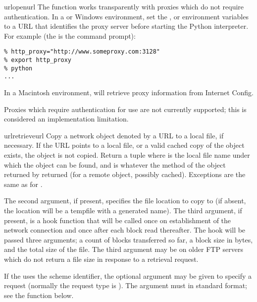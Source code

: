 \begin{funcdesc}{urlopen}{url}
The  function works transparently with proxies
which do not require authentication.  In a \UNIX{} or Windows
environment, set the ,  or
 environment variables to a URL that identifies
the proxy server before starting the Python interpreter.  For example
(the \character{\%} is the command prompt):

\begin{verbatim}
% http_proxy="http://www.someproxy.com:3128"
% export http_proxy
% python
...
\end{verbatim}

In a Macintosh environment,  will retrieve proxy
information from Internet Config.

Proxies which require authentication for use are not currently
supported; this is considered an implementation limitation.
\end{funcdesc}

\begin{funcdesc}{urlretrieve}{url}
Copy a network object denoted by a URL to a local file, if necessary.
If the URL points to a local file, or a valid cached copy of the
object exists, the object is not copied.  Return a tuple
 where  is the
local file name under which the object can be found, and 
is whatever the  method of the object returned by
 returned (for a remote object, possibly cached).
Exceptions are the same as for .

The second argument, if present, specifies the file location to copy
to (if absent, the location will be a tempfile with a generated name).
The third argument, if present, is a hook function that will be called
once on establishment of the network connection and once after each
block read thereafter.  The hook will be passed three arguments; a
count of blocks transferred so far, a block size in bytes, and the
total size of the file.  The third argument may be  on older
FTP servers which do not return a file size in response to a retrieval
request.

If the  uses the  scheme identifier, the optional
 argument may be given to specify a  request
(normally the request type is ).  The  argument
must in standard  format;
see the  function below.
\end{funcdesc}

